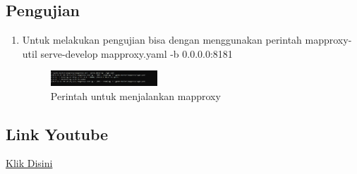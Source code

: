 \subsection{Pengujian}
\begin{enumerate}
    \item Untuk melakukan pengujian bisa dengan menggunakan perintah mapproxy-util serve-develop mapproxy.yaml -b 0.0.0.0:8181
    \hfill\break
    \begin{figure}[H]
		\includegraphics[width=4cm]{figures/1174015/5/17.png}
		\centering
		\caption{Perintah untuk menjalankan mapproxy}
    \end{figure}
\end{enumerate}
\subsection{Link Youtube}
\href{https://youtu.be/Yh9TqA9NNAQ}{Klik Disini}